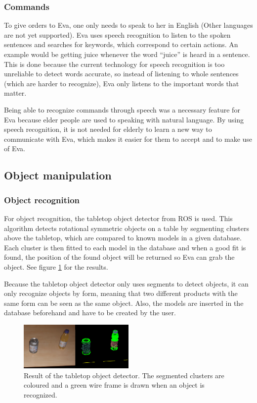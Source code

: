 \documentclass[project_eva.tex]{subfiles}
\begin{document}
\subsubsection*{Commands}
To give orders to Eva, one only needs to speak to her in English (Other languages are not yet supported). Eva uses speech 
recognition to listen to the spoken sentences and searches for keywords, which correspond to certain actions. An example 
would be getting juice whenever the word ``juice'' is heard in a sentence. This is done because the current technology for 
speech recognition is too unreliable to detect words accurate, so instead of listening to whole sentences (which are harder 
to recognize), Eva only listens to the important words that matter.

Being able to recognize commands through speech was a necessary feature for Eva because elder people are used to speaking 
with natural language. By using speech recognition, it is not needed for elderly to learn a new way to communicate with 
Eva, which makes it easier for them to accept and to make use of Eva.

\subsection*{Object manipulation}
\subsubsection*{Object recognition}
For object recognition, the tabletop object detector from ROS is used. This algorithm detects rotational symmetric objects on a table by segmenting clusters above the tabletop, which are compared to known models in a given database. Each cluster is then fitted to each model in the database and when a good fit is found, the position of the found object will be returned so Eva can grab the object. See figure \ref{fig:tabletop} for the results.

Because the tabletop object detector only uses segments to detect objects, it can only recognize objects by form, meaning that two different products with the same form can be seen as the same object. Also, the models are inserted in the database beforehand and have to be created by the user.

\begin{figure}[h]
	\centering
	\mbox{\includegraphics[width=0.5\textwidth]{Images/object_detector.png}}
	\caption{Result of the tabletop object detector. The segmented clusters are coloured and a green wire frame is drawn when an object is recognized.}
	\label{fig:tabletop}
\end{figure}
\end{document}
